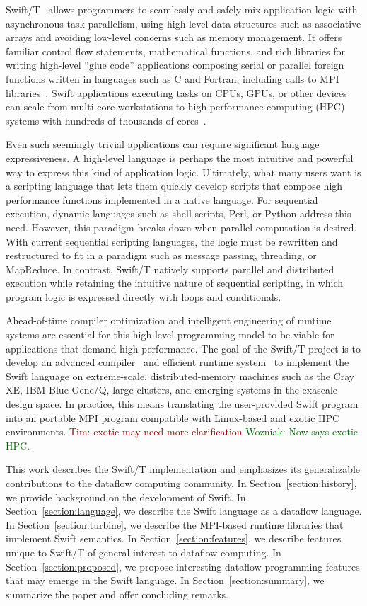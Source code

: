 \documentclass[conference,10pt]{IEEEtran}
\newcommand{\SwiftT}{Swift/T\xspace}
\newcommand{\woz}[1]{ {\textcolor{darkgreen} { Wozniak: #1 }}}
\newcommand{\arm}[1]{ {\textcolor{darkred} { Tim: #1 }}}
\newcommand{\woz}[1]{}
\newcommand{\arm}[1]{}
\begin{document}
\SwiftT~\cite{SwiftT_2013} allows programmers to seamlessly and safely
mix application logic with asynchronous task parallelism, using
high-level data structures such as associative arrays and avoiding
low-level concerns such as memory management.  It offers familiar
control flow statements, mathematical functions, and rich libraries
for writing high-level ``glue code'' applications composing serial or
parallel foreign functions written in languages such as C and Fortran,
including calls to MPI libraries~\cite{Wozniak_2013}.  Swift
applications executing tasks on CPUs, GPUs, or other devices can scale
from multi-core workstations to high-performance computing (HPC)
systems with hundreds of thousands of cores~\cite{Krieder_2014}.

Even such seemingly trivial applications
can require significant language expressiveness.
A high-level language is perhaps the most intuitive
and powerful way to express this kind of application logic.
Ultimately, what many users want is a scripting
language that lets them %
quickly develop scripts that compose high performance functions
implemented in a native language.
For sequential execution, dynamic languages such as
shell scripts, Perl, or Python address this need.
However, this paradigm breaks down when
parallel computation is desired. With current sequential
scripting languages, the logic must be rewritten and restructured
to fit in a paradigm such as message passing, threading, or MapReduce.
In contrast, \SwiftT natively supports parallel and distributed execution
while retaining the intuitive nature of sequential scripting, in which
program logic is expressed directly with loops and conditionals.

Ahead-of-time compiler optimization and intelligent engineering of
runtime systems are essential for this high-level programming model to
be viable for applications that demand high performance.  The goal of
the Swift/T project is to develop an advanced compiler~\cite{STC_2014}
and efficient runtime system~\cite{Turbine_2013} to implement the
Swift language on extreme-scale, distributed-memory machines such as
the Cray XE, IBM Blue Gene/Q, large clusters, and emerging systems in
the exascale design space.  In practice, this means translating the
user-provided Swift program into an portable MPI program compatible
with Linux-based and exotic HPC environments.
\arm{exotic may need more clarification}
\woz{Now says exotic HPC.}

This work describes the Swift/T implementation and emphasizes its
generalizable contributions to the dataflow computing community.  In
Section~\ref{section:history}, we provide background on the
development of Swift. In Section~\ref{section:language}, we describe
the Swift language as a dataflow language.  In
Section~\ref{section:turbine}, we describe the MPI-based runtime
libraries that implement Swift semantics.  In
Section~\ref{section:features}, we describe features unique to Swift/T
of general interest to dataflow computing.  In
Section~\ref{section:proposed}, we propose interesting dataflow
programming features that may emerge in the Swift language.  In
Section~\ref{section:summary}, we summarize the paper and offer
concluding remarks.
\end{document}
